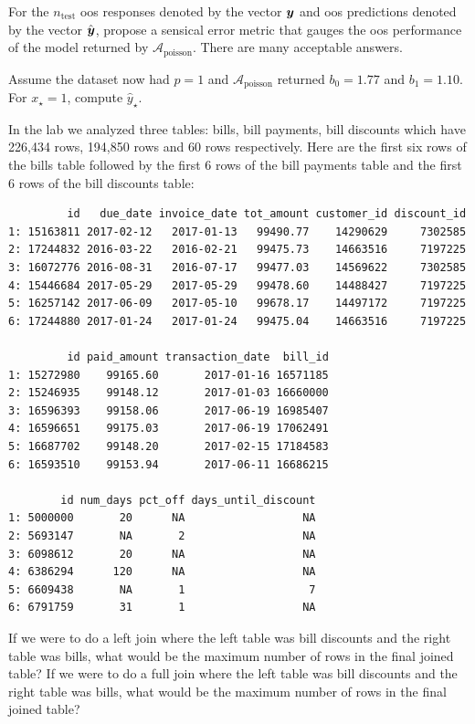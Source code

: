 \documentclass[12pt]{article}
\begin{document}
 For the $n_{\text{test}}$ oos responses denoted by the vector $\boldsymbol{y}$ and oos predictions denoted by the vector $\hat{\boldsymbol{y}}$, propose a sensical error metric that gauges the oos performance of the model returned by $\mathcal{A}_{\text{poisson}}$. There are many acceptable answers.

 Assume the dataset now had $p=1$ and $\mathcal{A}_{\text{poisson}}$ returned $b_0 = 1.77$ and $b_1 = 1.10$. For $x_\star = 1$, compute $\hat{y}_\star$.

\eenum


\problem In the lab we analyzed three tables: bills, bill payments, bill discounts which have 226,434 rows, 194,850 rows and 60 rows respectively. Here are the first six rows of the bills table followed by the first 6 rows of the bill payments table and the first 6 rows of the bill discounts table:

\begin{verbatim}
         id   due_date invoice_date tot_amount customer_id discount_id
1: 15163811 2017-02-12   2017-01-13   99490.77    14290629     7302585
2: 17244832 2016-03-22   2016-02-21   99475.73    14663516     7197225
3: 16072776 2016-08-31   2016-07-17   99477.03    14569622     7302585
4: 15446684 2017-05-29   2017-05-29   99478.60    14488427     7197225
5: 16257142 2017-06-09   2017-05-10   99678.17    14497172     7197225
6: 17244880 2017-01-24   2017-01-24   99475.04    14663516     7197225

         id paid_amount transaction_date  bill_id
1: 15272980    99165.60       2017-01-16 16571185
2: 15246935    99148.12       2017-01-03 16660000
3: 16596393    99158.06       2017-06-19 16985407
4: 16596651    99175.03       2017-06-19 17062491
5: 16687702    99148.20       2017-02-15 17184583
6: 16593510    99153.94       2017-06-11 16686215

        id num_days pct_off days_until_discount
1: 5000000       20      NA                  NA
2: 5693147       NA       2                  NA
3: 6098612       20      NA                  NA
4: 6386294      120      NA                  NA
5: 6609438       NA       1                   7
6: 6791759       31       1                  NA
\end{verbatim}

\benum
{} If we were to do a left join where the left table was bill discounts and the right table was bills, what would be the maximum number of rows in the final joined table? 
 If we were to do a full join where the left table was bill discounts and the right table was bills, what would be the maximum number of rows in the final joined table? 
\end{document}
